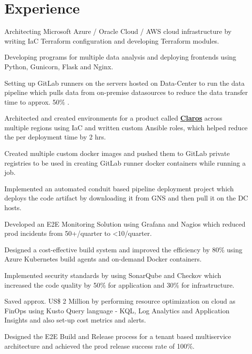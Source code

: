 \documentclass[a4paper]{deedy-resume-openfont}
\begin{document}
\begin{minipage}[t]{0.66\textwidth}
\section{Experience}
\vspace{\topsep} %
\begin{tightemize} %
\item Architecting Microsoft Azure / Oracle Cloud / AWS cloud infrastructure by writing IaC Terraform configuration and developing Terraform modules.
\item Developing programs for multiple data analysis and deploying frontends using Python, Gunicorn, Flask and Nginx.
\item Setting up GitLab runners on the servers hosted on Data-Center to run the data pipeline which pulls data from on-premise datasources to reduce the data transfer time to approx. 50\% .
\item Architected and created environments for a product called \href{https://www.hach.com/claros/overview#claros-video}{\bf Claros} across multiple regions using IaC and written custom Ansible roles, which helped reduce the per deployment time by 2 hrs.
\item Created multiple custom docker images and pushed them to GitLab private registries to be used in creating GitLab runner docker containers while running a job.
\item Implemented an automated conduit based pipeline deployment project which deploys the code artifact by downloading it from GNS and then pull it on the DC hosts.
\item Developed an E2E Monitoring Solution using Grafana and Nagios which reduced prod incidents from 50+/quarter to <10/quarter.
\item Designed a cost-effective build system and improved the efficiency by 80\% using Azure Kubernetes build agents and on-demand Docker containers.
\item Implemented security standards by using SonarQube and Checkov which increased the code quality by 50\% for application and 30\% for infrastructure.
\item Saved approx. US\$ 2 Million by performing resource optimization on cloud as FinOps using Kusto Query language - KQL, Log Analytics and Application Insights and also set-up cost metrics and alerts.
\item Designed the E2E Build and Release process for a tenant based multiservice architecture and achieved the prod release success rate of 100\%.

\end{tightemize}
\end{minipage}
\end{document}
